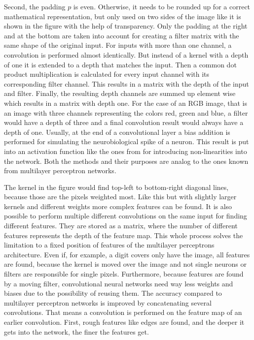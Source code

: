 Second, the padding $p$ is even.
Otherwise, it needs to be rounded up for a correct mathematical representation, but only used on two sides of the image like it is shown in the figure with the help of transparency.
Only the padding at the right and at the bottom are taken into account for creating a filter matrix with the same shape of the original input.
For inputs with more than one channel, a convolution is performed almost identically.
But instead of a kernel with a depth of one it is extended to a depth that matches the input.
Then a common dot product multiplication is calculated for every input channel with its corresponding filter channel.
This results in a matrix with the depth of the input and filter.
Finally, the resulting depth channels are summed up element wise which results in a matrix with depth one.
For the case of an RGB image, that is an image with three channels representing the colors red, green and blue, a filter would have a depth of three and a final convolution result would always have a depth of one.
Usually, at the end of a convolutional layer a bias addition is performed for simulating the neurobiological spike of a neuron.
This result is put into an activation function like the ones from  for introducing non-linearities into the network.
Both the methods and their purposes are analog to the ones known from multilayer perceptron networks.

The kernel in the figure would find top-left to bottom-right diagonal lines, because those are the pixels weighted most.
Like this but with slightly larger kernels and different weights more complex features can be found.
It is also possible to perform multiple different convolutions on the same input for finding different features.
They are stored as a matrix, where the number of different features represents the depth of the feature map.
This whole process solves the limitation to a fixed position of features of the multilayer perceptrons architecture.
Even if, for example, a digit covers only have the image, all features are found, because the kernel is moved over the image and not single neurons or filters are responsible for single pixels.
Furthermore, because features are found by a moving filter, convolutional neural networks need way less weights and biases due to the possibility of reusing them.
The accuracy compared to multilayer perceptron networks is improved by concatenating several convolutions.
That means a convolution is performed on the feature map of an earlier convolution.
First, rough features like edges are found, and the deeper it gets into the network, the finer the features get.